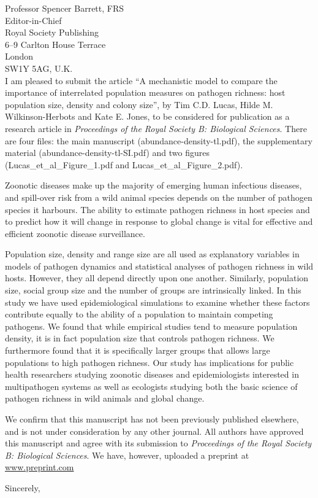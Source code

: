 \documentclass[10pt, a4paper]{letter} %
\begin{document}
\begin{letter}{
Professor Spencer Barrett, FRS\\
Editor-in-Chief\\
Royal Society Publishing\\
6--9 Carlton House Terrace\\
London\\
SW1Y 5AG, U.K.\\
}
I am pleased to submit the article ``A mechanistic model to compare the importance of interrelated population measures on pathogen richness: host population size, density and colony size'', by Tim C.D. Lucas, Hilde M. Wilkinson-Herbots and Kate E. Jones, to be considered for publication as a research article in \emph{Proceedings of the Royal Society B: Biological Sciences}.
There are four files: the main manuscript (abundance-density-tl.pdf), the supplementary material (abundance-density-tl-SI.pdf) and two figures (Lucas\_et\_al\_Figure\_1.pdf and Lucas\_et\_al\_Figure\_2.pdf).

Zoonotic diseases make up the majority of emerging human infectious diseases, and spill-over risk from a wild animal species depends on the number of pathogen species it harbours.
The ability to estimate pathogen richness in host species and to predict how it will change in response to global change is vital for effective and efficient zoonotic disease surveillance.

Population size, density and range size are all used as explanatory variables in models of pathogen dynamics and statistical analyses of pathogen richness in wild hosts.
However, they all depend directly upon one another.
Similarly, population size, social group size and the number of groups are intrinsically linked.
In this study we have used epidemiological simulations to examine whether these factors contribute equally to the ability of a population to maintain competing pathogens.
We found that while empirical studies tend to measure population density, it is in fact population size that controls pathogen richness.
We furthermore found that it is specifically larger groups that allows large populations to high pathogen richness.
Our study has implications for public health researchers studying zoonotic diseases and epidemiologists interested in multipathogen systems as well as ecologists studying both the basic science of pathogen richness in wild animals and global change.

We confirm that this manuscript has not been previously published elsewhere, and is not under consideration by any other journal. All authors have approved this manuscript and agree with its submission to \emph{Proceedings of the Royal Society B: Biological Sciences}.
We have, however, uploaded a preprint at \hyperref[www.preprint.com]{www.preprint.com} %

\closing{Sincerely,}



\end{letter}
\end{document}
